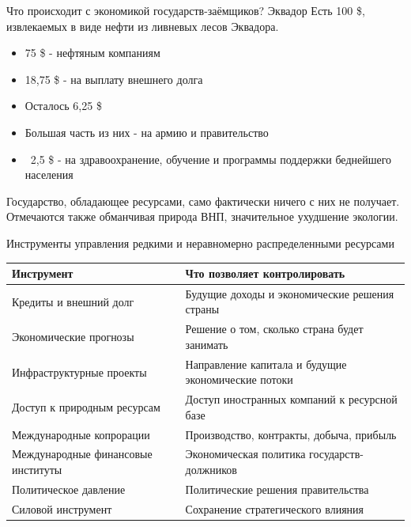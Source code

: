 \documentclass[10pt]{beamer}
\begin{document}
\begin{frame}{Что происходит с экономикой государств-заёмщиков? Эквадор}
 Есть 100 \$, извлекаемых в виде нефти из ливневых лесов Эквадора.
 \vspace{0.5cm}
 \begin{itemize}
    \item 75 \$ - нефтяным компаниям
    \item 18,75 \$ - на выплату внешнего долга
    \item Осталось 6,25 \$
    \item Большая часть из них - на армию и правительство
    \item ~2,5 \$ - на здравоохранение, обучение и программы поддержки беднейшего населения
\end{itemize}
\vspace{0.5cm}
Государство, обладающее ресурсами, само фактически ничего с них не получает.\\
Отмечаются также обманчивая природа ВНП, значительное ухудшение экологии.
\end{frame}

\begin{frame}{Инструменты управления редкими и неравномерно распределенными ресурсами}
\begin{table}[H]
\centering
\begin{tabular}{|>{\centering\arraybackslash}p{4cm}|>{\centering\arraybackslash}p{6cm}|}
\hline
\textbf{Инструмент} & \textbf{Что позволяет контролировать}\\ \hline
Кредиты и внешний долг & Будущие доходы и экономические решения страны \\ \hline
Экономические прогнозы & Решение о том, сколько страна будет занимать \\ \hline
Инфраструктурные проекты & Направление капитала и будущие экономические потоки  \\ \hline
Доступ к природным ресурсам & Доступ иностранных компаний к ресурсной базе \\ \hline
Международные копрорации& Производство, контракты, добыча, прибыль \\ \hline
Международные финансовые институты & Экономическая политика государств-должников \\ \hline
Политическое давление & Политические решения правительства \\ \hline
Силовой инструмент & Сохранение стратегического влияния \\ \hline
\end{tabular} 
\end{table}
\end{frame}
\end{document}
